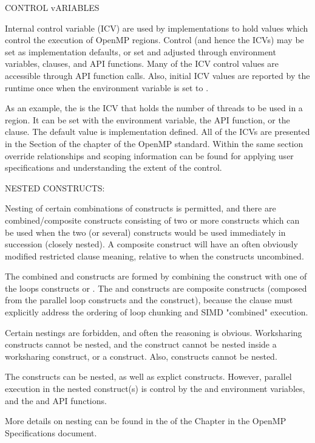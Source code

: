 CONTROL vARIABLES 

  Internal control variable (ICV) are used by implementations to hold values which control the execution
  of OpenMP regions.  Control (and hence the ICVs) may be set as implementation defaults, 
  or set and adjusted through environment variables, clauses, and API functions.  Many of the ICV control
  values are accessible through API function calls.  Also, initial ICV values are reported by the runtime
  once when the  environment variable is set to . 

  As an example, the  is the ICV that holds the number of threads
  to be used in a  region.  It can be set with the  environment variable, 
  the  API function, or the  clause.  The default 
  value is implementation defined.  All of the ICVs are presented in the  Section
  of the  chapter of the OpenMP standard.  Within the same section override relationships 
  and scoping information can be found for applying user specifications and understanding the extent of the control.

NESTED CONSTRUCTS:

Nesting of certain combinations of constructs is permitted, and there are combined/composite constructs
consisting of two or more constructs which can be used when the two (or several) constructs would be used
immediately in succession (closely nested).  A composite construct will have an often obviously modified
restricted clause meaning, relative to when the constructs uncombined. %

The combined  and  constructs are formed by combining the 
construct with one of the loops constructs  or .  The
 and  constructs are composite constructs (composed from
the parallel loop constructs and the  construct), because the  clause must
explicitly address the ordering of loop chunking and SIMD "combined" execution.

Certain nestings are forbidden, and often the reasoning is obvious.  Worksharing constructs cannot be nested, and
the  construct cannot be nested inside a worksharing construct, or a  construct. 
Also,  constructs cannot be nested.  

The  constructs can be nested, as well as explict  constructs.  However, parallel
execution in the nested  construct(s) is control by the  and 
 environment variables, and the  and 
 API functions.

More details on nesting can be found in the  of the  
Chapter in the OpenMP Specifications document.
